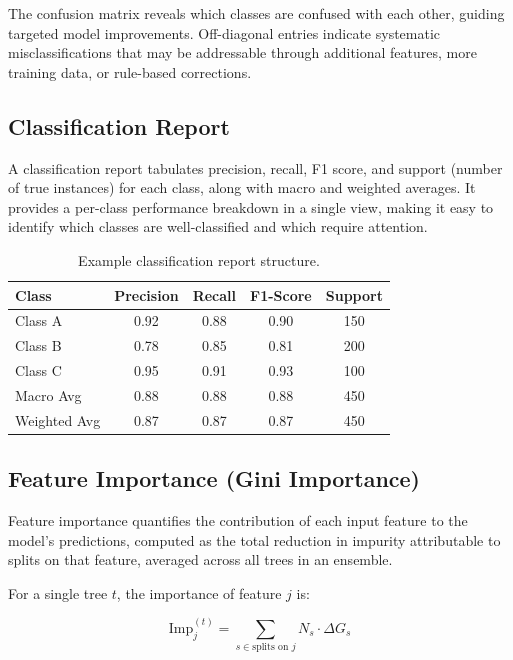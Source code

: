 \documentclass[10pt,a4paper]{article}
\begin{document}
The confusion matrix reveals which classes are confused with each other, guiding targeted model improvements. Off-diagonal entries indicate systematic misclassifications that may be addressable through additional features, more training data, or rule-based corrections.

\subsection{Classification Report}
\label{sec:classification-report}

A classification report tabulates precision, recall, F1 score, and support (number of true instances) for each class, along with macro and weighted averages. It provides a per-class performance breakdown in a single view, making it easy to identify which classes are well-classified and which require attention.

\begin{table}[H]
\centering
\caption{Example classification report structure.}
\label{tab:classification-report}
\begin{tabular}{lcccc}
\toprule
\textbf{Class} & \textbf{Precision} & \textbf{Recall} & \textbf{F1-Score} & \textbf{Support} \\
\midrule
Class A & 0.92 & 0.88 & 0.90 & 150 \\
Class B & 0.78 & 0.85 & 0.81 & 200 \\
Class C & 0.95 & 0.91 & 0.93 & 100 \\
\midrule
Macro Avg & 0.88 & 0.88 & 0.88 & 450 \\
Weighted Avg & 0.87 & 0.87 & 0.87 & 450 \\
\bottomrule
\end{tabular}
\end{table}

\subsection{Feature Importance (Gini Importance)}
\label{sec:feature-importance}

Feature importance quantifies the contribution of each input feature to the model's predictions, computed as the total reduction in impurity attributable to splits on that feature, averaged across all trees in an ensemble.

For a single tree $t$, the importance of feature $j$ is:

\begin{equation}
\text{Imp}_j^{(t)} = \sum_{s \in \text{splits on } j} N_s \cdot \Delta G_s
\label{eq:feature-importance-tree}
\end{equation}
\end{document}
